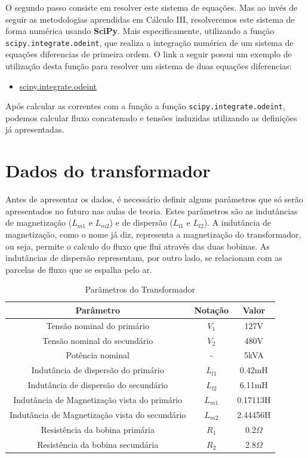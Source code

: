 \documentclass[a4paper]{article}
\theoremstyle{definition}
\theoremstyle{plain}
\begin{document}
O segundo passo consiste em resolver este sistema de equações. Mas ao invés de seguir as metodologias aprendidas em Cálculo III, resolveremos este sistema de forma numérica usando \textbf{SciPy}. Mais especificamente, utilizando a função \verb|scipy.integrate.odeint|, que realiza a integração numérica de um sistema de equações diferencias de primeira ordem. O link a seguir possui um exemplo de utilização desta função para resolver um sistema de duas equações diferencias:

\begin{itemize}
\item \href{https://docs.scipy.org/doc/scipy/reference/generated/scipy.integrate.odeint.html}{scipy.integrate.odeint}
\end{itemize}

Após calcular as correntes com a função a função \verb|scipy.integrate.odeint|, podemos calcular fluxo concatenado e tensões induzidas utilizando as definições já apresentadas.




\section{Dados do transformador}


Antes de apresentar os dados, é necessário definir alguns parâmetros que só serão apresentados no futuro nas aulas de teoria. Estes parâmetros são as indutâncias de magnetização ($L_{m1}$ e $L_{m2}$) e de dispersão ($L_{l1}$ e $L_{l2}$). A indutância de magnetização, como o nome já diz, representa a magnetização do transformador, ou seja, permite o calculo do fluxo que flui através das duas bobinas. As indutâncias de dispersão representam, por outro lado, se relacionam com as parcelas de fluxo que se espalha pelo ar.


\begin{table}[H]
\centering
\caption{Parâmetros do Transformador}
\begin{tabular}{ccc}
\hline
\textbf{Parâmetro} & \textbf{Notação} & \textbf{Valor}\\ \hline
Tensão nominal do primário & $V_1$ & 127V\\
Tensão nominal do secundário & $V_2$ & 480V\\
Potência nominal & - & 5kVA\\
Indutância de dispersão do primário & $L_{l1}$ & 0.42mH\\
Indutância de dispersão do secundário & $L_{l2}$ & 6.11mH\\ 
Indutância de Magnetização vista do primário & $L_{m1}$ & 0.17113H\\ 
Indutância de Magnetização vista do secundário & $L_{m2}$ & 2.44456H\\ 
Resistência da bobina primária & $R_{1}$ & 0.2$\Omega$\\ 
Resistência da bobina secundária & $R_{2}$ & 2.8$\Omega$\\ 
\hline
\end{tabular}
\end{table}
\end{document}
